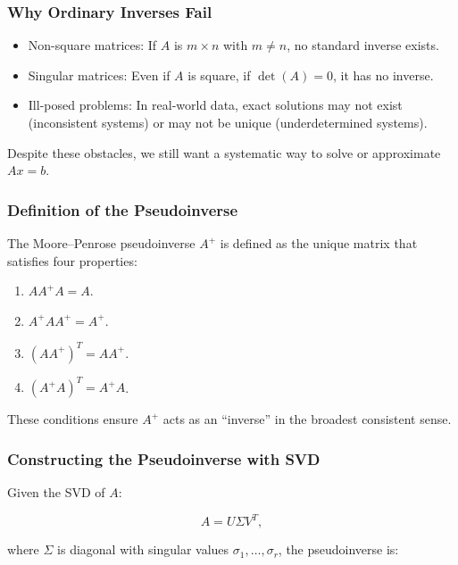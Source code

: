 \documentclass[
  letterpaper,
  DIV=11,
  numbers=noendperiod]{scrreprt}
\providecommand{\tightlist}{%
  \setlength{\itemsep}{0pt}\setlength{\parskip}{0pt}}
\begin{document}
\subsubsection{Why Ordinary Inverses
Fail}\label{why-ordinary-inverses-fail}

\begin{itemize}
\tightlist
\item
  Non-square matrices: If \(A\) is \(m \times n\) with \(m \neq n\), no
  standard inverse exists.
\item
  Singular matrices: Even if \(A\) is square, if \(\det(A) = 0\), it has
  no inverse.
\item
  Ill-posed problems: In real-world data, exact solutions may not exist
  (inconsistent systems) or may not be unique (underdetermined systems).
\end{itemize}

Despite these obstacles, we still want a systematic way to solve or
approximate \(Ax = b\).

\subsubsection{Definition of the
Pseudoinverse}\label{definition-of-the-pseudoinverse}

The Moore--Penrose pseudoinverse \(A^+\) is defined as the unique matrix
that satisfies four properties:

\begin{enumerate}
\def\labelenumi{\arabic{enumi}.}
\tightlist
\item
  \(AA^+A = A\).
\item
  \(A^+AA^+ = A^+\).
\item
  \((AA^+)^T = AA^+\).
\item
  \((A^+A)^T = A^+A\).
\end{enumerate}

These conditions ensure \(A^+\) acts as an ``inverse'' in the broadest
consistent sense.

\subsubsection{Constructing the Pseudoinverse with
SVD}\label{constructing-the-pseudoinverse-with-svd}

Given the SVD of \(A\):

\[
A = U \Sigma V^T,
\]

where \(\Sigma\) is diagonal with singular values
\(\sigma_1, \dots, \sigma_r\), the pseudoinverse is:
\end{document}
